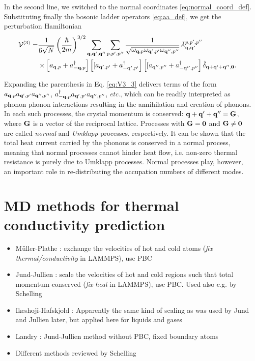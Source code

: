 In the second line, we switched to the normal coordinates \eqref{eq:normal_coord_def}. Substituting finally the bosonic ladder operators \eqref{eq:aa_def}, we get the perturbation Hamiltonian
\begin{alignat}{2}
\mathcal{V}^{(3)} = & \frac{1}{6\sqrt{N}} \left(\frac{\hbar}{2m} \right)^{3/2} \sum_{\mathbf{q},\mathbf{q}',\mathbf{q}''} \sum_{p,p',p''} \frac{1}{\sqrt{\omega_{\mathbf{q},p}\omega_{\mathbf{q}',p'} \omega_{\mathbf{q}'',p''}}} \tilde{A}^{p,p',p''}_{\mathbf{q},\mathbf{q}'} \notag \\
  & \times \left[a_{\mathbf{q},p}+a_{-\mathbf{q},p}^{\dagger} \right] \left[[a_{\mathbf{q}',p'}+a_{-\mathbf{q}',p'}^{\dagger}\right] \left[[a_{\mathbf{q}'',p''}+a_{-\mathbf{q}'',p''}^{\dagger}\right] \hat \delta_{\mathbf{q}+\mathbf{q}'+\mathbf{q}'',\mathbf{0}}. \label{eq:V3_3}
\end{alignat}

Expanding the parenthesis in Eq. \eqref{eq:V3_3} delivers terms of the form $a_{\mathbf{q},p}a_{\mathbf{q}',p'}a_{\mathbf{q}'',p''}$, $a_{-\mathbf{q},p}^{\dagger} a_{\mathbf{q}',p'}a_{\mathbf{q}'',p''}$, \textit{etc}., which can be readily interpreted as phonon-phonon interactions resulting in the annihilation and creation of phonons. In each such processes, the crystal momentum is conserved: $\mathbf{q}+\mathbf{q}'+\mathbf{q}''=\mathbf{G}$, where $\mathbf{G}$ is a vector of the reciprocal lattice. Processes with $\mathbf{G}=\mathbf{0}$ and $\mathbf{G}\neq \mathbf{0}$ are called \textit{normal} and \textit{Umklapp} processes, respectively. It can be shown \cite{ziman} that the total heat current carried by the phonons is conserved in a normal process, meaning that normal processes cannot hinder heat flow, i.e. non-zero thermal resistance is purely due to Umklapp processes. Normal processes play, however, an important role in re-distributing the occupation numbers of different modes.

\chapter{MD methods for thermal conductivity prediction}

\begin{itemize}
 \item M\"uller-Plathe \cite{mullerplathe97}: exchange the velocities of hot and cold atoms (\textit{fix thermal/conductivity} in LAMMPS), use PBC
 \item Jund-Jullien \cite{jund99}: scale the velocities of hot and cold regions such that total momentum conserved (\textit{fix heat} in LAMMPS), use PBC. Used also e.g. by Schelling
 \item Ikeshoji-Hafskjold \cite{ikeshoji94}: Apparently the same kind of scaling as was used by Jund and Jullien later, but applied here for liquids and gases
 \item Landry \cite{landry08}: Jund-Jullien method without PBC, fixed boundary atoms
 \item Different methods reviewed by Schelling
\end{itemize}

